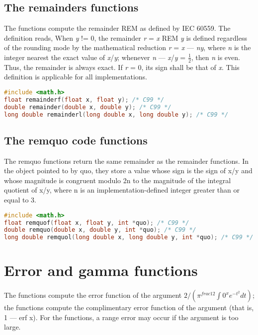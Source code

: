 \subsection{The remainders functions}
The functions compute the remainder REM as defined by IEC 60559. The definition
reads, When \emph{y} != 0, the remainder \emph{r} = \emph{x} REM \emph{y} is
defined regardless of the rounding mode by the mathematical reduction \emph{r}
= \emph{x} --- \emph{ny}, where \emph{n} is the integer nearest the exact value
of \emph{x}/\emph{y}; whenever \textbar{}\emph{n} ---
\emph{x}/\emph{y}\textbar{} = $\frac{1}{2}$, then \emph{n} is even.  Thus, the
remainder is always exact. If \emph{r} = 0, its sign shall be that of \emph{x}.
This definition is applicable for all implementations.
\lstset{basicstyle=\scriptsize, numbers=left, captionpos=b, tabsize=4}
\begin{lstlisting}[caption=Section \thesection listing \arabic{furthermathcnt},language={C},
breaklines=true,xleftmargin=15pt,label=lst:section\thesection listing\arabic{furthermathcnt}]
#include <math.h>
float remainderf(float x, float y); /* C99 */
double remainder(double x, double y); /* C99 */
long double remainderl(long double x, long double y); /* C99 */
\end{lstlisting}

\subsection{The remquo code functions}
The remquo functions return the same remainder as the remainder functions. In
the object pointed to by quo, they store a value whose sign is the sign of x/y
and whose magnitude is congruent modulo 2n to the magnitude of the integral
quotient of x/y, where n is an implementation-defined integer greater than or
equal to 3.
\lstset{basicstyle=\scriptsize, numbers=left, captionpos=b, tabsize=4}
\begin{lstlisting}[caption=Section \thesection listing \arabic{furthermathcnt},language={C},
breaklines=true,xleftmargin=15pt,label=lst:section\thesection listing\arabic{furthermathcnt}]
#include <math.h>
float remquof(float x, float y, int *quo); /* C99 */
double remquo(double x, double y, int *quo); /* C99 */
long double remquol(long double x, long double y, int *quo); /* C99 */
\end{lstlisting}

\section{Error and gamma functions}
The functions compute the error function of the argument $2/(\pi^{frac{1}{2}}
\int 0^{x} e^{-t^{2}} dt)$; the functions compute the complimentary error
function of the argument (that is, 1 --- erf x). For the functions, a range
error may occur if the argument is too large.

